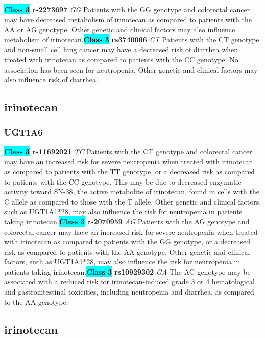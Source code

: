 \documentclass{book}
\begin{document}
\begin{center}
\textbf{\colorbox{cyan} {Class 3}} \textbf{ rs2273697 } \textit{ GG }
Patients with the GG genotype and colorectal cancer may have decreased metabolism of irinotecan as compared to patients with the AA or AG genotype. Other genetic and clinical factors may also influence metabolism of irinotecan.\textbf{\colorbox{cyan} {Class 3}} \textbf{ rs3740066 } \textit{ CT }
Patients with the CT genotype and non-small cell lung cancer may have a decreased risk of diarrhea when treated with irinotecan as compared to patients with the CC genotype. No association has been seen for neutropenia. Other genetic and clinical factors may also influence risk of diarrhea.


\end{center}\subsection{ irinotecan }


\subsubsection{ UGT1A6 }

\begin{center}
\textbf{\colorbox{cyan} {Class 3}} \textbf{ rs11692021 } \textit{ TC }
Patients with the CT genotype and colorectal cancer may have an increased risk for severe neutropenia when treated with irinotecan as compared to patients with the TT genotype, or a decreased risk as compared to patients with the CC genotype. This may be due to decreased enzymatic activity toward SN-38, the active metabolite of irinotecan, found in cells with the C allele as compared to those with the T allele. Other genetic and clinical factors, such as UGT1A1*28, may also influence the risk for neutropenia in patients taking irinotecan.\textbf{\colorbox{cyan} {Class 3}} \textbf{ rs2070959 } \textit{ AG }
Patients with the AG genotype and colorectal cancer may have an increased risk for severe neutropenia when treated with irinotecan as compared to patients with the GG genotype, or a decreased risk as compared to patients with the AA genotype. Other genetic and clinical factors, such as UGT1A1*28, may also influence the risk for neutropenia in patients taking irinotecan.\textbf{\colorbox{cyan} {Class 3}} \textbf{ rs10929302 } \textit{ GA }
The AG genotype may be associated with a reduced risk for irinotecan-induced grade 3 or 4 hematological and gastrointestinal toxicities, including neutropenia and diarrhea, as compared to the AA genotype. 


\end{center}\subsection{ irinotecan }
\end{document}
